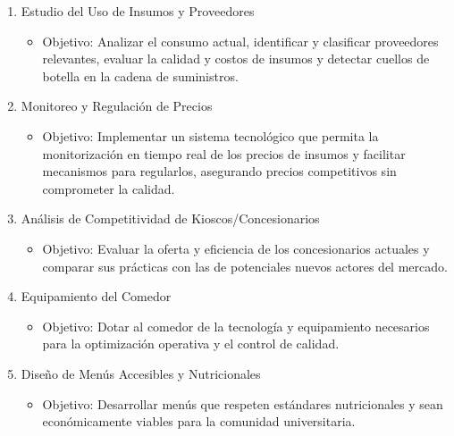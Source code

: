 \documentclass[letterpaper, 11pt]{report}
\begin{document}
\begin{enumerate}
      \item Estudio del Uso de Insumos y Proveedores \begin{itemize}
                  \item Objetivo: Analizar el consumo actual, identificar y clasificar proveedores
                        relevantes, evaluar la calidad y costos de insumos y detectar cuellos de
                        botella en la cadena de suministros.
            \end{itemize}

      \item Monitoreo y Regulación de Precios \begin{itemize}
                  \item Objetivo: Implementar un sistema tecnológico que permita la monitorización en
                        tiempo real de los precios de insumos y facilitar mecanismos para regularlos,
                        asegurando precios competitivos sin comprometer la calidad.
            \end{itemize}

      \item Análisis de Competitividad de Kioscos/Concesionarios \begin{itemize}
                  \item Objetivo: Evaluar la oferta y eficiencia de los concesionarios actuales y
                        comparar sus prácticas con las de potenciales nuevos actores del mercado.
            \end{itemize}

      \item Equipamiento del Comedor \begin{itemize}
                  \item Objetivo: Dotar al comedor de la tecnología y equipamiento necesarios para la
                        optimización operativa y el control de calidad.
            \end{itemize}

      \item Diseño de Menús Accesibles y Nutricionales \begin{itemize}
                  \item Objetivo: Desarrollar menús que respeten estándares nutricionales y sean
                        económicamente viables para la comunidad universitaria.
            \end{itemize}
\end{enumerate}
\end{document}
